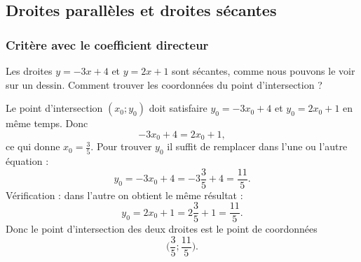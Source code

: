 %


\subsection{Droites parallèles et droites sécantes}

\subsubsection{Critère avec le coefficient directeur}

\begin{example}
    Les droites \( y=-3x+4\) et \( y=2x+1\) sont sécantes, comme nous pouvons le voir sur un dessin. Comment trouver les coordonnées du point d'intersection ?

    Le point d'intersection \( (x_0;y_0)\) doit satisfaire \( y_0=-3x_0+4\) et \( y_0=2x_0+1\) en même temps. Donc
    \begin{equation}
        -3x_0+4=2x_0+1,
    \end{equation}
    ce qui donne \( x_0=\frac{ 3 }{ 5 }\). Pour trouver \( y_0\) il suffit de remplacer dans l'une ou l'autre équation :
    \begin{equation}
        y_0=-3x_0+4=-3\frac{ 3 }{ 5 }+4=\frac{ 11 }{ 5 }.
    \end{equation}
    Vérification : dans l'autre on obtient le même résultat :
    \begin{equation}
        y_0=2x_0+1=2\frac{ 3 }{ 5 }+1=\frac{ 11 }{ 5 }.
    \end{equation}
    Donc le point d'intersection des deux droites est le point de coordonnées
    \begin{equation}
        \big( \frac{ 3 }{ 5 };\frac{ 11 }{ 5 } \big).
    \end{equation}
\end{example}

